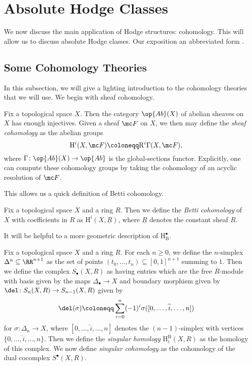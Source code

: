 \documentclass[../thesis.tex]{subfiles}
\begin{document}

\section{Absolute Hodge Classes}
We now discuss the main application of Hodge structures: cohomology. This will allow us to discuss absolute Hodge classes. Our exposition an abbreviated form \cite{deligne-hodge}.

\subsection{Some Cohomology Theories} \label{subsec:review-cohom}
In this subsection, we will give a lighting introduction to the cohomology theories that we will use. We begin with sheaf cohomology.
\begin{defihelper} 
	Fix a topological space $X$. Then the category $\op{Ab}(X)$ of abelian sheaves on $X$ has enough injectives. Given a sheaf $\mc F$ on $X$, we then may define the \textit{sheaf cohomology} as the abelian groups
	\[\mathrm H^i(X,\mc F)\coloneqq\mathrm R^i\Gamma(X,\mc F),\]
	where $\Gamma\colon\op{Ab}(X)\to\op{Ab}$ is the global-sections functor. Explicitly, one can compute these cohomology groups by taking the cohomology of an acyclic resolution of $\mc F$.
\end{defihelper}
This allows us a quick definition of Betti cohomology.
\begin{defihelper} 
	Fix a topological space $X$ and a ring $R$. Then we define the \textit{Betti cohomology} of $X$ with coefficients in $R$ as $\mathrm H^i(X,\underline R)$, where $\underline R$ denotes the constant sheaf $R$.
\end{defihelper}
It will be helpful to a more geometric description of $\mathrm H^\bullet_{\mathrm B}$.
\begin{defihelper}  
	Fix a topological space $X$ and a ring $R$. For each $n\ge0$, we define the $n$-simplex $\Delta^n\subseteq\RR^{n+1}$ as the set of points $(t_0,\ldots,t_n)\subseteq[0,1]^{n+1}$ summing to $1$. Then we define the complex $S_\bullet(X,R)$ as having entries which are the free $R$-module with basis given by the maps $\Delta_\bullet\to X$ and boundary morphism given by $\del\colon S_{n}(X,R)\to S_{n-1}(X,R)$ given by
	\[\del(\sigma)\coloneqq\sum_{i=0}^n(-1)^i\sigma([0,\ldots,\widehat i,\ldots,n])\]
	for $\sigma\colon\Delta_n\to X$, where $[0,\ldots,\widehat i,\ldots,n]$ denotes the $(n-1)$-simplex with vertices $\{0,\ldots,\widehat i,\ldots,n\}$. Then we define the \textit{singular homology} $\mathrm H^{\mathrm B}_i(X,R)$ as the homology of this complex. We now define \textit{singular cohomology} as the cohomology of the dual cocomplex $S^\bullet(X,R)$.
\end{defihelper}
\end{document}
